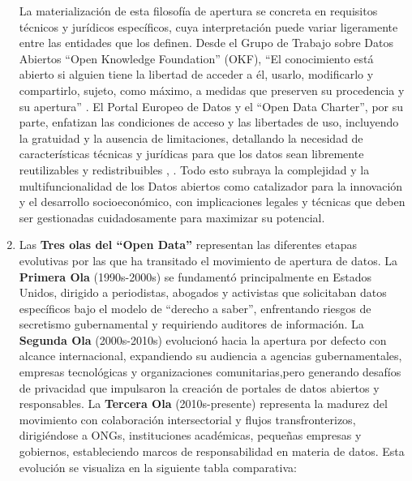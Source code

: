 \begin{enumerate}
	La materialización de esta filosofía de apertura se concreta en requisitos técnicos y jurídicos específicos, cuya interpretación puede variar ligeramente entre las entidades que los definen. Desde el Grupo de Trabajo sobre Datos Abiertos ``Open Knowledge Foundation'' (OKF), “El conocimiento está abierto si alguien tiene la libertad de acceder a él, usarlo, modificarlo y compartirlo, sujeto, como máximo, a medidas que preserven su procedencia y su apertura” \citep{OpenKnowledgeFoundation}. El Portal Europeo de Datos y el ``Open Data Charter'', por su parte, enfatizan las condiciones de acceso y las libertades de uso, incluyendo la gratuidad y la ausencia de limitaciones, detallando la necesidad de características técnicas y jurídicas para que los datos sean libremente reutilizables y redistribuibles \citep{dataEuropaOpenData}, \citep{Open_Data_Charter}.
	Todo esto subraya la complejidad y la multifuncionalidad de los Datos abiertos como catalizador para la innovación y el desarrollo socioeconómico, con implicaciones legales y técnicas que deben ser gestionadas cuidadosamente para maximizar su potencial.
	
	\item Las \textbf{Tres olas del ``Open Data'' } \label{def5} representan las diferentes etapas evolutivas por las que ha transitado el movimiento de apertura de datos. 
	La \textbf{Primera Ola} (1990s-2000s) se fundamentó principalmente en Estados Unidos, dirigido a periodistas, abogados y activistas que solicitaban datos específicos bajo el modelo de ``derecho a saber'', enfrentando riesgos de secretismo gubernamental y requiriendo auditores de información. 
	La \textbf{Segunda Ola} (2000s-2010s) evolucionó hacia la apertura por defecto con alcance internacional, expandiendo su audiencia a agencias gubernamentales, empresas tecnológicas y organizaciones comunitarias,pero generando desafíos de privacidad que impulsaron la creación de portales de datos abiertos y responsables.
	La \textbf{Tercera Ola} (2010s-presente) representa la madurez del movimiento  con colaboración intersectorial y flujos transfronterizos, dirigiéndose a ONGs, instituciones académicas, pequeñas empresas y gobiernos, estableciendo marcos de responsabilidad en materia de datos. 
	Esta evolución se visualiza en la siguiente tabla comparativa:
	

\end{enumerate}
